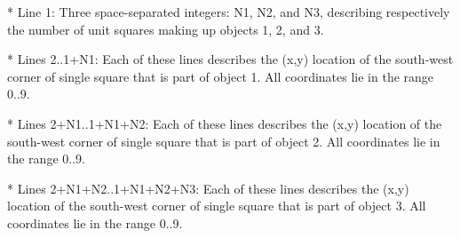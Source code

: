 * Line 1: Three space-separated integers: N1, N2, and N3, describing         respectively the number of unit squares making up objects 1,         2, and 3.

* Lines 2..1+N1: Each of these lines describes the (x,y) location of         the south-west corner of single square that is part of object         1.  All coordinates lie in the range 0..9.

* Lines 2+N1..1+N1+N2: Each of these lines describes the (x,y)         location of the south-west corner of single square that is         part of object 2.  All coordinates lie in the range 0..9.

* Lines 2+N1+N2..1+N1+N2+N3: Each of these lines describes the (x,y)         location of the south-west corner of single square that is         part of object 3.  All coordinates lie in the range 0..9.